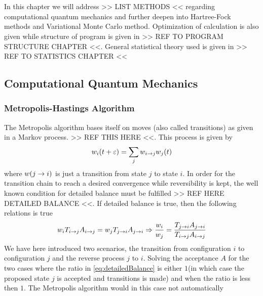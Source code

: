\chapter{}
    In this chapter we will address >> LIST METHODS << regarding computational
    quantum mechanics and further deepen into Hartree-Fock methods and
    Variational Monte Carlo method. Optimization of calculation is also given
    while structure of program is given in >> REF TO PROGRAM STRUCTURE CHAPTER
    <<. General statistical theory used is given in >> REF TO STATISTICS CHAPTER <<
\section{Computational Quantum Mechanics}
    \subsection{Metropolis-Hastings Algorithm}
        The Metropolis algorithm bases itself on moves (also called
        transitions) as given in a Markov process. >> REF THIS HERE <<. This
        process is given by
            \begin{equation}
                w_i(t+\varepsilon) = \sum_jw_{i\rightarrow j}w_j(t)
            \end{equation}
        where $w(j\rightarrow i)$ is just a transition from state $j$ to state $i$.
        In order for the transition chain to reach a desired convergence while
        reversibility is kept, the well known condition for detailed balance
        must be fulfilled >> REF HERE DETAILED BALANCE <<. If detailed balance
        is true, then the following relations is true
            \begin{equation}
                w_i T_{i\rightarrow j}A_{i\rightarrow j} = w_j T_{j\rightarrow i}A_{j\rightarrow i}
                \Rightarrow \frac{w_i}{w_j} =
                \frac{T_{j\rightarrow i}A_{j\rightarrow i}}{T_{i\rightarrow j}A_{i\rightarrow j}}
                \label{eq:detailedBalance}
            \end{equation}
        We have here introduced two scenarios, the transition from
        configuration $i$ to configuration $j$ and the reverse process $j$ to
        $i$. Solving the acceptance $A$ for the two cases where the ratio in
        \ref{eq:detailedBalance} is either $1$(in which case the proposed state
        $j$ is accepted and transitions is made) and when the ratio is less
        then $1$. The Metropolis algorithm would in this case not automatically
